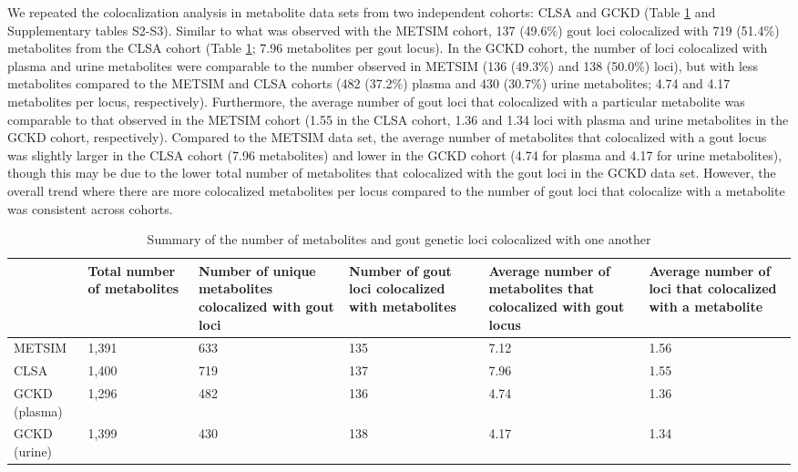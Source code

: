 \documentclass[a4paper,10pt]{article}
\begin{document}
We repeated the colocalization analysis in metabolite data sets from two independent cohorts: CLSA and GCKD (Table \ref{tab:sum_coloc} and Supplementary tables S2-S3).
Similar to what was observed with the METSIM cohort, 137 (49.6\%) gout loci colocalized with 719 (51.4\%) metabolites from the CLSA cohort (Table \ref{tab:sum_coloc}; 7.96 metabolites per gout locus).
In the GCKD cohort, the number of loci colocalized with plasma and urine metabolites were comparable to the number observed in METSIM (136 (49.3\%) and 138 (50.0\%) loci), but with less metabolites compared to the METSIM and CLSA cohorts (482 (37.2\%) plasma and 430 (30.7\%) urine metabolites; 4.74 and 4.17 metabolites per locus, respectively).
Furthermore, the average number of gout loci that colocalized with a particular metabolite was comparable to that observed in the METSIM cohort (1.55 in the CLSA cohort, 1.36 and 1.34 loci with plasma and urine metabolites in the GCKD cohort, respectively).
Compared to the METSIM data set, the average number of metabolites that colocalized with a gout locus was slightly larger in the CLSA cohort (7.96 metabolites) and lower in the GCKD cohort (4.74 for plasma and 4.17 for urine metabolites), though this may be due to the lower total number of metabolites that colocalized with the gout loci in the GCKD data set.
However, the overall trend where there are more colocalized metabolites per locus compared to the number of gout loci that colocalize with a metabolite was consistent across cohorts.
\\

\begin{table}[h]
	\hspace{-6.0em}
	\begin{tabular}{|p{3cm}|p{3cm}|p{3cm}|p{3cm}|p{3cm}|p{3cm}|}
		\hline
		& Total number of metabolites & Number of unique metabolites colocalized with gout loci & Number of gout loci colocalized with metabolites & Average number of metabolites that colocalized with gout locus\tablefootnote[1]{Note that the average number of metabolites per gout locus includes metabolites colocalized to multiple loci.} & Average number of loci that colocalized with a metabolite\\
		\hline
		METSIM             & 1,391 & 633 & 135 & 7.12 & 1.56 \\
		CLSA               & 1,400 & 719 & 137 & 7.96 & 1.55 \\
		GCKD (plasma) & 1,296 & 482 & 136 & 4.74 & 1.36 \\
		GCKD (urine)  & 1,399 & 430 & 138 & 4.17 & 1.34 \\
		\hline
	\end{tabular}
	\caption{Summary of the number of metabolites and gout genetic loci colocalized with one another}
	\label{tab:sum_coloc}
\end{table}
\\
\end{document}
